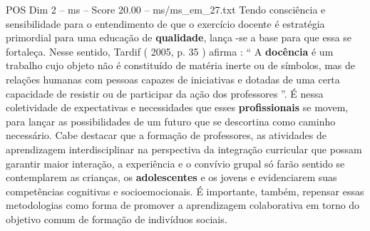\begin{textsample}{POS Dim 2 – ms – Score 20.00 – ms/ms\_em\_27.txt}
Tendo consciência e sensibilidade para o entendimento de que o exercício docente é estratégia primordial para uma educação de \textbf{qualidade}, lança -se a base para que essa se fortaleça.
Nesse sentido, Tardif ( 2005, p. 35 ) afirma : “ A \textbf{docência} é um trabalho cujo objeto não é constituído de matéria inerte ou de símbolos, mas de relações humanas com pessoas capazes de iniciativas e dotadas de uma certa capacidade de resistir ou de participar da ação dos professores ”.
É nessa coletividade de expectativas e necessidades que esses \textbf{profissionais} se movem, para lançar as possibilidades de um futuro que se descortina como caminho necessário.
Cabe destacar que a formação de professores, as atividades de aprendizagem interdisciplinar na perspectiva da integração curricular que possam garantir maior interação, a experiência e o convívio grupal só farão sentido se contemplarem as crianças, os \textbf{adolescentes} e os jovens e evidenciarem suas competências cognitivas e socioemocionais.
É importante, também, repensar essas metodologias como forma de promover a aprendizagem colaborativa em torno do objetivo comum de formação de indivíduos sociais.

\end{textsample}
